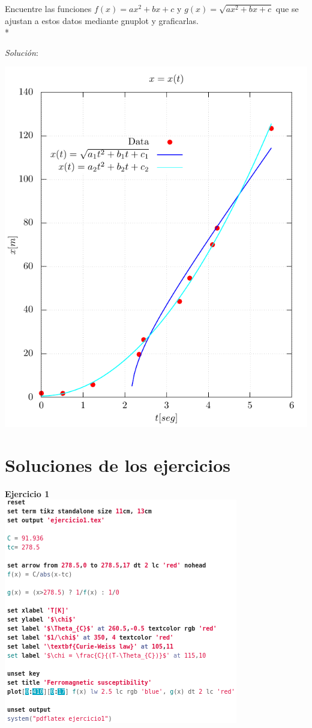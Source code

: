 \documentclass[11.5pt,a4paper]{article}
\begin{document}
Encuentre las funciones $f(x)=ax^2+bx+c$ y $g(x)=\sqrt{ax^2+bx+c}$ que se ajustan a estos datos mediante gnuplot y graficarlas.\\*

\textit{Solución}:

\includegraphics[scale=0.75]{ejercicio3.pdf}\\

\newpage

\section{Soluciones de los ejercicios}

\textbf{Ejercicio 1}\\

\includegraphics[scale=0.75]{screen13.png}\\
\end{document}
